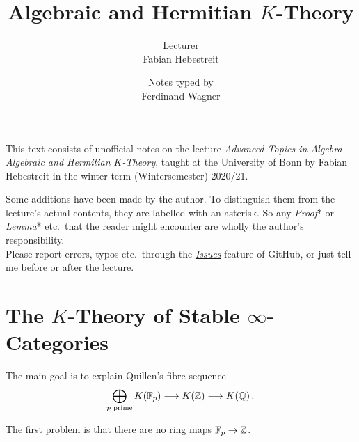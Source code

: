 \documentclass[a4paper, 10pt, oneside, DIV=9, chapterprefix=true, numbers=enddot,bibliography=totoc]{scrbook}
\title{Algebraic and Hermitian $K$-Theory}
\author{{\normalsize Lecturer}\\
	Fabian Hebestreit}
\date{{\normalsize Notes typed by}\\
	Ferdinand Wagner}
\begin{document}
	\frontmatter
	\renewcommand{\thedummy}{\arabic{dummy}}
	\maketitle
	\noindent This text consists of unofficial notes on the lecture \emph{Advanced Topics in Algebra -- Algebraic and Hermitian $K$-Theory}, taught at the University of
	Bonn by Fabian Hebestreit in the winter term (Wintersemester) 2020/21.
	
	Some additions have been made by the author. To distinguish them from the lecture's actual contents, they are labelled with an asterisk. So any \emph{Proof}* or \emph{Lemma}* etc.\ that the reader might encounter are wholly the author's responsibility.
	\\[\thmsep]Please report errors, typos etc.\ through the \href{https://github.com/FlorianAdler/AlgebraBonn/issues/new}{\emph{Issues}} feature of GitHub, or just tell me before or after the lecture.
	
	
	\tableofcontents
	\setcounter{llecture}{-1}
	\mainmatter{}
	\renewcommand{\thedummy}{\thechapter.\arabic{dummy}}
	\setcounter{chapter}{-1}
	\renewcommand{\thechapter}{\arabic{chapter}}
	
	\renewcommand{\thechapter}{\Roman{chapter}}
	
	





\chapter{The \texorpdfstring{$K$}{K}-Theory of Stable \texorpdfstring{$\infty$}{Infinity}-Categories}

The main goal is to explain Quillen's fibre sequence
\begin{equation*}
 \bigoplus_{p\text{ prime}}K(\IF_p)\morphism  K(\IZ)\morphism K(\IQ)\,.
\end{equation*}


The first problem is that there are no ring maps $\IF_p\morphism \IZ$. 
\end{document}
